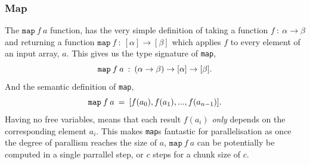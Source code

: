 \documentclass[11pt]{article}
\begin{document}
\subsubsection{Map}
The $\texttt{map} \: f \: a$ function, has the very simple definition of taking a function $f \: : \: \alpha \to \beta$ and returning a function $\mathtt{map} \:f \: : \: [\alpha] \to [\beta]$  which
 applies $f$ to every element of an input array, $a$.  This gives us the type signature of \texttt{map},
$$\mathtt{map} \: f \: a \: :  \: (\alpha \to \beta) \to [\alpha] \to [\beta]\mathnormal{.}$$
And the semantic definition of \texttt{map},
$$\mathtt{map} \: f \: a \: =  \: [f(a_0), f(a_1), ..., f(a_{n-1})]\mathnormal{.}$$
Having no free variables, means that each result $f(a_i)$ \textit{only} depends on the corresponding element $a_i$. This makes \texttt{map}s fantastic for parallelisation as once the
 degree of parallism reaches the size of $a$, $\mathtt{map} \: f \: a$ can be potentially be computed in a single parrallel step, or $c$ steps for a chunk size of $c$.
\end{document}
